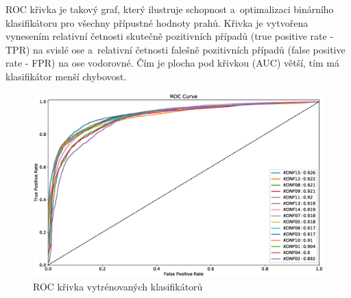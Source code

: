 ROC křivka je takový graf, který ilustruje schopnost a~optimalizaci binárního klasifikátoru pro všechny přípustné hodnoty prahů. Křivka je vytvořena vynesením relativní četnosti skutečně pozitivních případů (true positive rate - TPR) na svislé ose a~relativní četnosti falešně pozitivních případů (false positive rate - FPR) na ose vodorovné. Čím je plocha pod křivkou (AUC) větší, tím má klasifikátor menší chybovost. 

\begin{figure}[H]
\centering
\includegraphics[width=16cm]{figures/roc1}
\caption{ROC křivka vytrénovaných klasifikátorů}
\label{fig:rocCurve1}
\end{figure}

